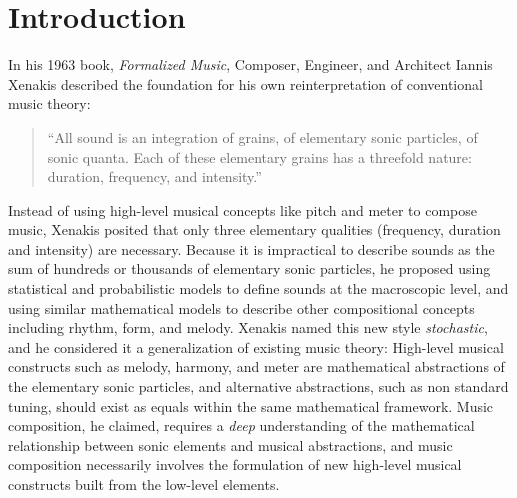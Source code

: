 \clearpage
\chapter{Introduction}
\label{ch:introduction}
In his 1963 book, \textit{Formalized Music}, Composer, Engineer, and
Architect Iannis Xenakis described the foundation for his own
reinterpretation of conventional music theory:
\begin{quotation}
  ``All sound is an integration of grains, of elementary sonic
  particles, of sonic quanta. Each of these elementary grains has a
  threefold nature: duration, frequency, and intensity.''
\end{quotation}
Instead of using high-level musical concepts like pitch and meter to
compose music, Xenakis posited that only three elementary qualities
(frequency, duration and intensity) are necessary. Because it is
impractical to describe sounds as the sum of hundreds or thousands of
elementary sonic particles, he proposed using statistical and
probabilistic models to define sounds at the macroscopic level, and
using similar mathematical models to describe other compositional
concepts including rhythm, form, and melody. Xenakis named this new
style \textit{stochastic}, and he considered it a generalization of
existing music theory: High-level musical constructs such as melody,
harmony, and meter are mathematical abstractions of the elementary
sonic particles, and alternative abstractions, such as non standard
tuning, should exist as equals within the same mathematical
framework. Music composition, he claimed, requires a \emph{deep}
understanding of the mathematical relationship between sonic elements
and musical abstractions, and music composition necessarily involves
the formulation of new high-level musical constructs built from the
low-level elements.

